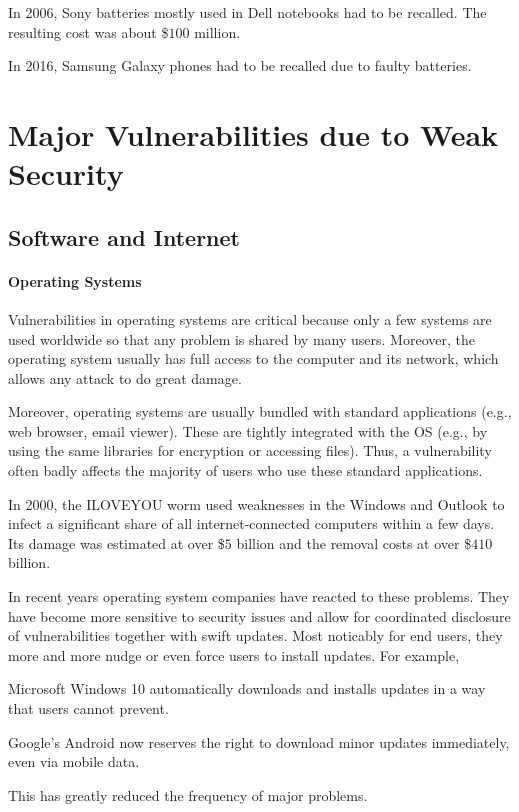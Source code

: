 In 2006, Sony batteries mostly used in Dell notebooks had to be recalled.
The resulting cost was about \$$100$ million.

In 2016, Samsung Galaxy phones had to be recalled due to faulty batteries.

\section{Major Vulnerabilities due to Weak Security}

\subsection{Software and Internet}

\paragraph{Operating Systems}
Vulnerabilities in operating systems are critical because only a few systems are used worldwide so that any problem is shared by many users.
Moreover, the operating system usually has full access to the computer and its network, which allows any attack to do great damage.

Moreover, operating systems are usually bundled with standard applications (e.g., web browser, email viewer).
These are tightly integrated with the OS (e.g., by using the same libraries for encryption or accessing files).
Thus, a vulnerability often badly affects the majority of users who use these standard applications.

In 2000, the ILOVEYOU worm used weaknesses in the Windows and Outlook to infect a significant share of all internet-connected computers within a few days.
Its damage was estimated at over \$$5$ billion and the removal costs at over \$$410$ billion.

In recent years operating system companies have reacted to these problems.
They have become more sensitive to security issues and allow for coordinated disclosure of vulnerabilities together with swift updates.
Most noticably for end users, they more and more nudge or even force users to install updates.
For example,
\begin{compactitem}
\item Microsoft Windows 10 automatically downloads and installs updates in a way that users cannot prevent.
\item Google's Android now reserves the right to download minor updates immediately, even via mobile data.
\end{compactitem}
This has greatly reduced the frequency of major problems.

